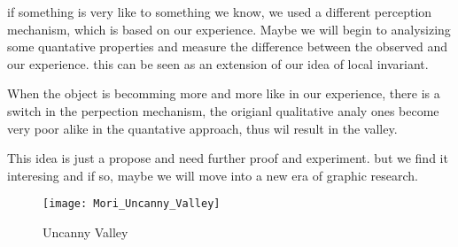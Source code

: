 if something is very like to something we know, we used a different perception mechanism, which is based on our experience.
Maybe we will begin to analysizing some quantative properties and measure the difference between the observed and our experience.
this can be seen as an extension of our idea of local invariant.


When the object is becomming more and more like in our experience, there is a switch in the perpection mechanism, the origianl qualitative analy ones become very poor alike in the quantative approach,
thus wil result in the valley.

This idea is just a propose and need further proof and experiment.
but we find it interesing and if so, maybe we will move into a new era of graphic research.


\begin{figure}[!htbp]
  \begin{center}
      \texttt{[image: Mori\_Uncanny\_Valley]}
    \caption{Uncanny Valley}
    \label{fig:fishplot}
\end{center}
\end{figure}



